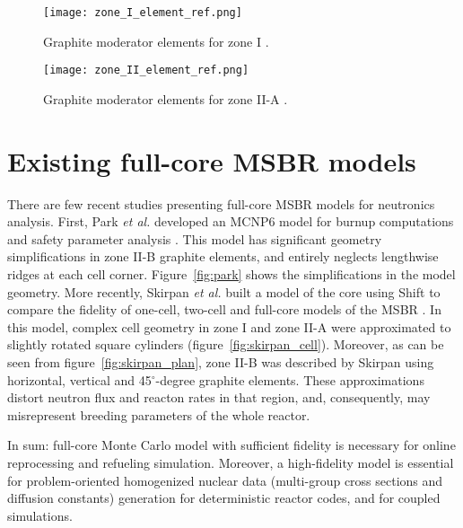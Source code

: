 \begin{figure}[hbp!] %
  \centering
  \vspace{-0.3em}
  \texttt{[image: zone\_I\_element\_ref.png]}
  \caption{Graphite moderator elements for zone I \cite{robertson_conceptual_1971,rykhlevskii_full-core_2017}.}
  \vspace{-0.6em}
  \label{fig:I_element_ref}
\end{figure}
\FloatBarrier

\begin{figure}[hbp!] %
  \centering
  \vspace{-0.3em}
  \texttt{[image: zone\_II\_element\_ref.png]}
  \caption{Graphite moderator elements for zone II-A \cite{robertson_conceptual_1971,rykhlevskii_full-core_2017}.}
  \vspace{-0.6em}
  \label{fig:II_element_ref}
\end{figure}
\FloatBarrier

\section{Existing full-core MSBR models}
There are few recent studies presenting full-core \gls{MSBR} models for neutronics analysis. First, Park \emph{et al.} developed an MCNP6 model for burnup computations and safety parameter analysis \cite{park_whole_2015}. This model has significant geometry simplifications in zone II-B graphite elements, and entirely neglects lengthwise ridges at each cell corner. Figure~\ref{fig:park} shows the simplifications in the model geometry.  More recently, Skirpan \emph{et al.} built a model of the core using Shift \cite{pandya_implementation_2016} to compare the fidelity of one-cell, two-cell and full-core models of the \gls{MSBR} \cite{skirpan_fuel_2017}. In this model, complex cell geometry in zone I and zone II-A were approximated to slightly rotated square cylinders (figure~\ref{fig:skirpan_cell}). Moreover, as can be seen from figure~\ref{fig:skirpan_plan}, zone II-B was described by Skirpan \cite{skirpan_fuel_2017} using horizontal, vertical and 45$^\circ$-degree graphite elements. These approximations distort neutron flux and reacton rates in that region, and, consequently, may misrepresent breeding parameters of the whole reactor.

In sum: full-core Monte Carlo model with sufficient fidelity is necessary for online reprocessing and refueling simulation. Moreover, a high-fidelity model is essential for problem-oriented homogenized nuclear data (multi-group cross sections and diffusion constants) generation for deterministic reactor codes, and for coupled simulations.

